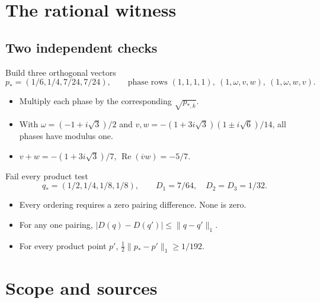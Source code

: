 \documentclass{beamer}
\begin{document}
\section{The rational witness}
\subsection{Two independent checks}
\begin{frame}{Build three orthogonal vectors}
  \[
    p_*=(1/6,1/4,7/24,7/24),\qquad
    \text{phase rows } (1,1,1,1),\ (1,\omega,v,w),\ (1,\omega,w,v).
  \]
  \begin{itemize}
    \item Multiply each phase by the corresponding $\sqrt{p_{*,k}}$.
    \item With $\omega=(-1+i\sqrt3)/2$ and $v,w=-(1+3i\sqrt3)(1\pm i\sqrt6)/14$, all phases have modulus one.
    \item $v+w=-(1+3i\sqrt3)/7$, $\operatorname{Re}(\overline v w)=-5/7$.
  \end{itemize}
\end{frame}
\begin{frame}{Fail every product test}
  \[
    q_*=(1/2,1/4,1/8,1/8),\qquad
    D_1=7/64,\quad D_2=D_3=1/32.
  \]
  \begin{itemize}
    \item Every ordering requires a zero pairing difference. None is zero.
    \item For any one pairing, $|D(q)-D(q')|\le \|q-q'\|_1$.
    \item For every product point $p'$, $\tfrac12\|p_*-p'\|_1\ge 1/192$.
  \end{itemize}
\end{frame}
\section{Scope and sources}
\end{document}
